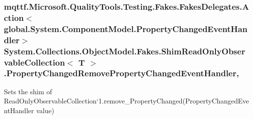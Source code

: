 \hypertarget{class_system_1_1_collections_1_1_object_model_1_1_fakes_1_1_shim_read_only_observable_collection_3_01_t_01_4_a3f049258ec3bd478838ff82f8dd930a1}{
\subsubsection[{Property\-Changed\-Remove\-Property\-Changed\-Event\-Handler}]{\setlength{\rightskip}{0pt plus 5cm}mqttf.\-Microsoft.\-Quality\-Tools.\-Testing.\-Fakes.\-Fakes\-Delegates.\-Action$<$global.\-System.\-Component\-Model.\-Property\-Changed\-Event\-Handler$>$ System.\-Collections.\-Object\-Model.\-Fakes.\-Shim\-Read\-Only\-Observable\-Collection$<$ T $>$.Property\-Changed\-Remove\-Property\-Changed\-Event\-Handler\hspace{0.3cm}{\ttfamily [set]}, {\ttfamily [remove]}}}\label{class_system_1_1_collections_1_1_object_model_1_1_fakes_1_1_shim_read_only_observable_collection_3_01_t_01_4_a3f049258ec3bd478838ff82f8dd930a1}


Sets the shim of Read\-Only\-Observable\-Collection`1.remove\-\_\-\-Property\-Changed(\-Property\-Changed\-Event\-Handler value)

